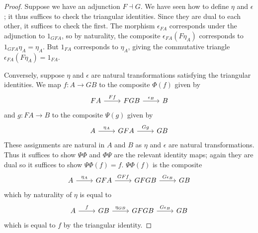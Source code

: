 \begin{proof}
    Suppose we have an adjunction \( F \dashv G \).
    We have seen how to define \( \eta \) and \( \epsilon \); it thus suffices to check the triangular identities.
    Since they are dual to each other, it suffices to check the first.
    The morphism \( \epsilon_{FA} \) corresponds under the adjunction to \( 1_{GFA} \), so by naturality, the composite \( \epsilon_{FA} (F\eta_A) \) corresponds to \( 1_{GFA} \eta_A = \eta_A \).
    But \( 1_{FA} \) corresponds to \( \eta_A \), giving the commutative triangle \( \epsilon_{FA} (F\eta_A) = 1_{FA} \).

    Conversely, suppose \( \eta \) and \( \epsilon \) are natural transformations satisfying the triangular identities.
    We map \( f : A \to GB \) to the composite \( \Phi(f) \) given by
\[\begin{tikzcd}
	FA & FGB & B
	\arrow["Ff", from=1-1, to=1-2]
	\arrow["{\epsilon_B}", from=1-2, to=1-3]
\end{tikzcd}\]
    and \( g : FA \to B \) to the composite \( \Psi(g) \) given by
    \[\begin{tikzcd}
        A & GFA & GB
        \arrow["{\eta_A}", from=1-1, to=1-2]
        \arrow["Gg", from=1-2, to=1-3]
    \end{tikzcd}\]
    These assignments are natural in \( A \) and \( B \) as \( \eta \) and \( \epsilon \) are natural transformations.
    Thus it suffices to show \( \Psi \Phi \) and \( \Phi \Psi \) are the relevant identity maps; again they are dual so it suffices to show \( \Psi \Phi(f) = f \).
    \( \Psi \Phi(f) \) is the composite%
    \[\begin{tikzcd}
        A & GFA & GFGB & GB
        \arrow["{\eta_A}", from=1-1, to=1-2]
        \arrow["GFf", from=1-2, to=1-3]
        \arrow["{G\epsilon_B}", from=1-3, to=1-4]
    \end{tikzcd}\]
    which by naturality of \( \eta \) is equal to
\[\begin{tikzcd}
	A & GB & GFGB & GB
	\arrow["f", from=1-1, to=1-2]
	\arrow["{\eta_{GB}}", from=1-2, to=1-3]
	\arrow["{G\epsilon_B}", from=1-3, to=1-4]
\end{tikzcd}\]
    which is equal to \( f \) by the triangular identity.
\end{proof}
